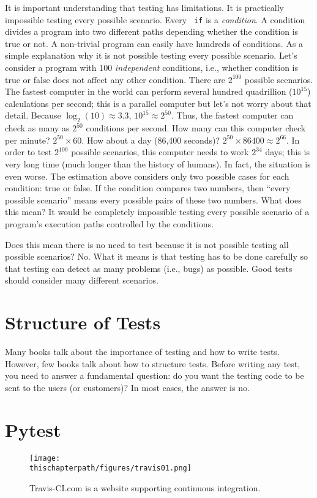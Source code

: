 It is important understanding that testing has limitations.  It is
practically impossible testing every possible scenario.  Every {\tt
  if} is a {\it condition}. A condition divides a program into two
different paths depending whether the condition is true or not.  A
non-trivial program can easily have hundreds of conditions.  As a
simple explanation why it is not possible testing every possible
scenario. Let's consider a program with 100 {\it independent}
conditions, i.e., whether condition is true or false does not affect
any other condition.  There are $2^{100}$ possible scenarios.  The
fastest computer in the world can perform several hundred quadrillion
($10^{15}$) calculations per second; this is a parallel computer but
let's not worry about that detail.  Because $\log_2(10) \approx 3.3$,
$10^{15} \approx 2 ^ {50}$. Thus, the fastest computer can check as
many as $2 ^ {50}$ conditions per second. How many can this computer
check per minute? $2 ^ {50} \times 60$. How about a day (86,400
seconds)?  $2 ^ {50} \times 86400 \approx 2 ^ {66}$.  In order to test
$2^{100}$ possible scenarios, this computer needs to work $2^{34}$
days; this is very long time (much longer than the history of humans).
In fact, the situation is even worse.  The estimation above considers
only two possible cases for each condition: true or false. If the
condition compares two numbers, then ``every possible scenario'' means
every possible pairs of these two numbers.  What does this mean? It
would be completely impossible testing every possible scenario of a
program's execution paths controlled by the conditions.

Does this mean there is no need to test because it is not possible
testing all possible scenarios? No. What it means is that testing has to
be done carefully so that testing can detect as many problems (i.e.,
bugs) as possible.  Good tests should consider many different scenarios.

\section{Structure of Tests}


Many books talk about the importance of testing and how to write
tests.  However, few books talk about how to structure tests. Before
writing any test, you need to answer a fundamental question: do you
want the testing code to be sent to the users (or customers)?  In most
cases, the answer is no.


\section{Pytest}





\begin{figure}[h] \centering
{\texttt{[image: \\thischapterpath/figures/travis01.png]}}
\caption{Travis-CI.com is a website supporting continuous integration.}
\label{fig:travis01}
\end{figure}
